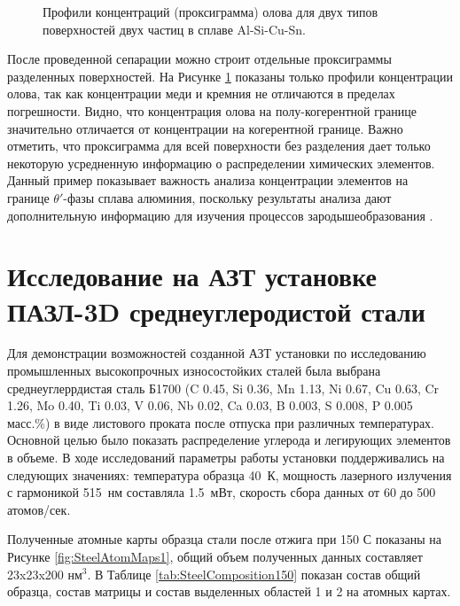 \begin{figure}[htb]
	\caption{Профили концентраций (проксиграмма) олова для двух типов поверхностей двух частиц в сплаве Al-Si-Cu-Sn.}
	\label{fig:AlCu_Sn_proxy}
\end{figure}

\FloatBarrier

После проведенной сепарации можно строит отдельные проксиграммы разделенных поверхностей. На Рисунке \cref{fig:AlCu_Sn_proxy} показаны только профили концентрации олова, так как концентрации меди и кремния не отличаются в пределах погрешности. Видно, что концентрация олова на полу-когерентной границе значительно отличается от концентрации на когерентной границе. Важно отметить, что проксиграмма для всей поверхности без разделения дает только некоторую усредненную информацию о распределении химических элементов. Данный пример показывает важность анализа концентрации элементов на границе $\theta '$-фазы сплава алюминия, поскольку результаты анализа дают дополнительную информацию для изучения процессов зародышеобразования \cite{Akopyan2022A319}.





\FloatBarrier

\section{Исследование на АЗТ установке ПАЗЛ-3D среднеуглеродистой стали}\label{sec:ch4/sect2}

Для демонстрации возможностей созданной АЗТ установки по исследованию промышленных высокопрочных износостойких сталей была выбрана среднеуглеррдистая сталь Б1700 (C 0.45, Si 0.36, Mn 1.13, Ni 0.67, Cu 0.63, Cr 1.26, Mo 0.40, Ti 0.03, V 0.06, Nb 0.02, Ca 0.03, B 0.003, S 0.008, P 0.005 масс.\%) в виде листового проката после отпуска при различных температурах. Основной целью было показать распределение углерода и легирующих элементов в объеме. В ходе исследований параметры работы установки поддерживались на следующих значениях: температура образца 40~К, мощность лазерного излучения с гармоникой 515~нм составляла 1.5~мВт, скорость сбора данных от 60 до 500 атомов/сек.

Полученные атомные карты образца стали после отжига при 150 \textdegree С показаны на Рисунке \cref{fig:SteelAtomMaps1}, общий объем полученных данных составляет 23x23x200 нм$^{3}$. В Таблице \cref{tab:SteelComposition150} показан состав общий образца, состав матрицы и состав выделенных областей 1 и 2 на атомных картах.

